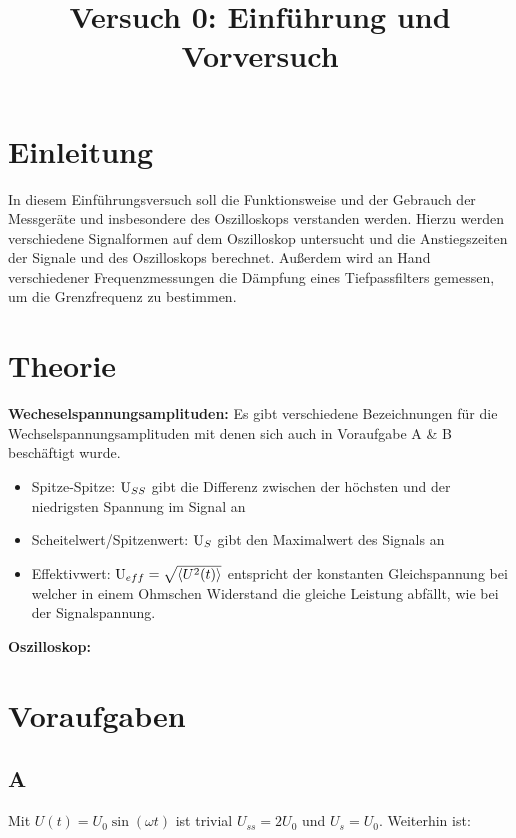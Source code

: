 



\title{Versuch 0: Einführung und Vorversuch}
\maketitle
\tableofcontents
\disclaimer



\chapter{Einleitung}
In diesem Einführungsversuch soll die Funktionsweise und der Gebrauch der Messgeräte und insbesondere des Oszilloskops verstanden werden. Hierzu werden verschiedene Signalformen auf dem Oszilloskop untersucht und die Anstiegszeiten der Signale und des Oszilloskops berechnet. Außerdem wird an Hand verschiedener Frequenzmessungen die Dämpfung eines Tiefpassfilters gemessen, um die Grenzfrequenz zu bestimmen.

\chapter{Theorie}
\textbf{Wecheselspannungsamplituden:} Es gibt verschiedene Bezeichnungen für die Wechselspannungsamplituden mit denen sich auch in Voraufgabe A \& B beschäftigt wurde. \\
\begin{itemize}
    \item Spitze-Spitze: $ \text U_{SS}$ gibt die Differenz zwischen der höchsten und der niedrigsten Spannung im Signal an
    \item Scheitelwert/Spitzenwert: $\text U_S$ gibt den Maximalwert des Signals an
    \item Effektivwert: $\text U_{eff} = \sqrt{\langle U^2(t)\rangle}$\sgl{} entspricht der konstanten Gleichspannung bei welcher in einem Ohmschen Widerstand die gleiche Leistung abfällt, wie bei der Signalspannung.
\end{itemize}

\textbf{Oszilloskop:}


\chapter{Voraufgaben}
\section{A}
Mit $U(t) = U_0 \sin(\omega t)$ ist trivial $U_{ss} = 2 U_0$ und $U_s = U_0$.
Weiterhin ist:

